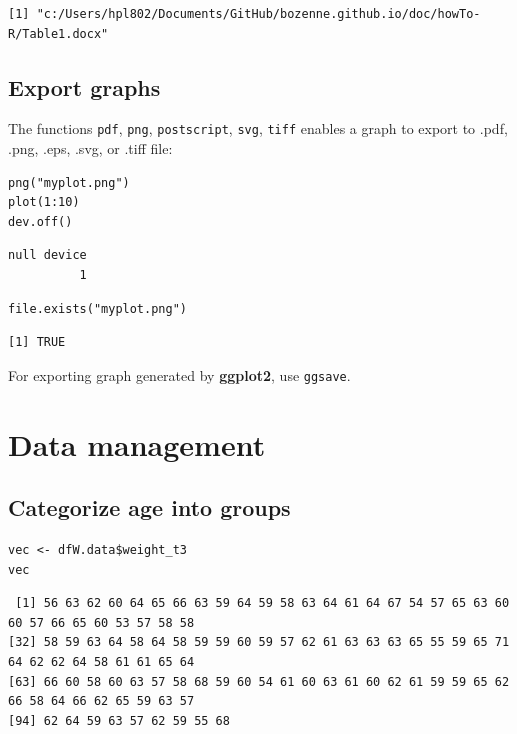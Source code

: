 \documentclass{article}
\begin{document}
\begin{verbatim}
[1] "c:/Users/hpl802/Documents/GitHub/bozenne.github.io/doc/howTo-R/Table1.docx"
\end{verbatim}

\subsection{Export graphs}
\label{sec:orgd15217a}

The functions \texttt{pdf}, \texttt{png}, \texttt{postscript}, \texttt{svg}, \texttt{tiff} enables a graph to
export to .pdf, .png, .eps, .svg, or .tiff file:
\lstset{language=r,label= ,caption= ,captionpos=b,numbers=none}
\begin{lstlisting}
png("myplot.png")
plot(1:10)
dev.off()
\end{lstlisting}

\begin{verbatim}
null device 
          1
\end{verbatim}

\lstset{language=r,label= ,caption= ,captionpos=b,numbers=none}
\begin{lstlisting}
file.exists("myplot.png")
\end{lstlisting}

\begin{verbatim}
[1] TRUE
\end{verbatim}

For exporting graph generated by \textbf{ggplot2}, use \texttt{ggsave}.

\section{Data management}
\label{sec:org11bd7b7}
\subsection{Categorize age into groups}
\label{sec:org6eadcd6}
\lstset{language=r,label= ,caption= ,captionpos=b,numbers=none}
\begin{lstlisting}
vec <- dfW.data$weight_t3
vec
\end{lstlisting}

\begin{verbatim}
 [1] 56 63 62 60 64 65 66 63 59 64 59 58 63 64 61 64 67 54 57 65 63 60 60 57 66 65 60 53 57 58 58
[32] 58 59 63 64 58 64 58 59 59 60 59 57 62 61 63 63 63 65 55 59 65 71 64 62 62 64 58 61 61 65 64
[63] 66 60 58 60 63 57 58 68 59 60 54 61 60 63 61 60 62 61 59 59 65 62 66 58 64 66 62 65 59 63 57
[94] 62 64 59 63 57 62 59 55 68
\end{verbatim}
\end{document}
